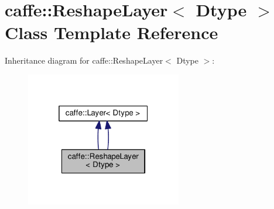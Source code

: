 \hypertarget{classcaffe_1_1_reshape_layer}{}\section{caffe\+:\+:Reshape\+Layer$<$ Dtype $>$ Class Template Reference}
\label{classcaffe_1_1_reshape_layer}


Inheritance diagram for caffe\+:\+:Reshape\+Layer$<$ Dtype $>$\+:
\nopagebreak
\begin{figure}[H]
\begin{center}
\leavevmode
\includegraphics[width=193pt]{classcaffe_1_1_reshape_layer__inherit__graph}
\end{center}
\end{figure}

